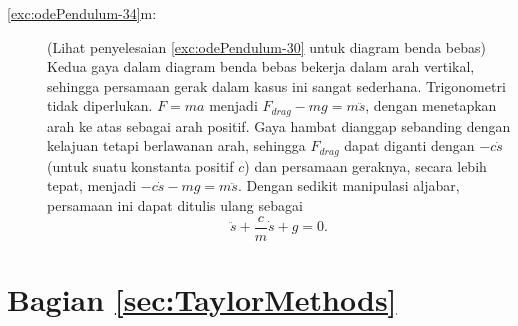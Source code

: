 \begin{description}
\item [{\ref{exc:odePendulum-34}m:}] (Lihat penyelesaian \ref{exc:odePendulum-30}
untuk diagram benda bebas) Kedua gaya dalam diagram benda bebas bekerja
dalam arah vertikal, sehingga persamaan gerak dalam kasus ini sangat
sederhana. Trigonometri tidak diperlukan. $F=ma$ menjadi $F_{drag}-mg=m\ddot{s}$,
dengan menetapkan arah ke atas sebagai arah positif. Gaya hambat dianggap
sebanding dengan kelajuan tetapi berlawanan arah, sehingga $F_{drag}$
dapat diganti dengan $-c\dot{s}$ (untuk suatu konstanta positif $c$)
dan persamaan geraknya, secara lebih tepat, menjadi $-c\dot{s}-mg=m\ddot{s}$.
Dengan sedikit manipulasi aljabar, persamaan ini dapat ditulis ulang
sebagai
\[
\ddot{s}+\frac{c}{m}\dot{s}+g=0.
\]
\end{description}

\section*{Bagian \ref{sec:TaylorMethods}}
